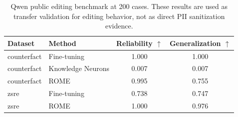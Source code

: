 \begin{table}[t]
\centering
\small
\caption{Qwen public editing benchmark at 200 cases. These results are used as transfer validation for editing behavior, not as direct PII sanitization evidence.}
\label{tab:public-qwen}
\begin{tabular}{llcc}
\toprule
Dataset & Method & Reliability $\uparrow$ & Generalization $\uparrow$ \\
\midrule
counterfact & Fine-tuning & 1.000 & 1.000 \\
counterfact & Knowledge Neurons & 0.007 & 0.007 \\
counterfact & ROME & 0.995 & 0.755 \\
zsre & Fine-tuning & 0.738 & 0.747 \\
zsre & ROME & 1.000 & 0.976 \\
\bottomrule
\end{tabular}
\end{table}
